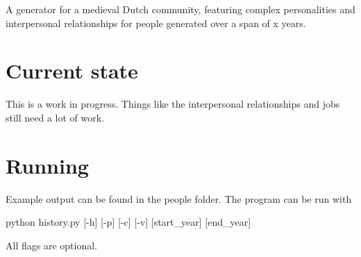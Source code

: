 A generator for a medieval Dutch community, featuring complex personalities and interpersonal relationships for people generated over a span of x years.

\section*{Current state}

This is a work in progress. Things like the interpersonal relationships and jobs still need a lot of work.

\section*{Running}

Example output can be found in the people folder. The program can be run with 
\begin{DoxyCode}
python history.py [-h] [-p] [-c] [-v] [start\_year] [end\_year]
\end{DoxyCode}
 All flags are optional. 